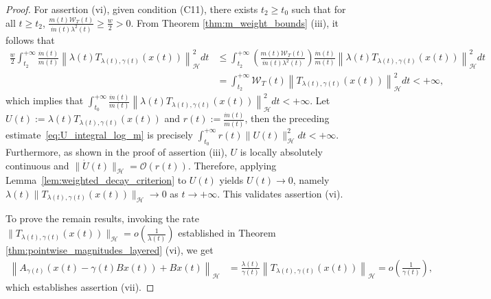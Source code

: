 \documentclass{article}
\theoremstyle{definition}
\theoremstyle{definition}
\theoremstyle{definition}
\begin{document}
\begin{proof}
For assertion (vi), given condition (C11), there exists $t_2 \ge t_0$ such that for all $t \ge t_2$, $\frac{m(t) \mathcal{W}_T(t)}{\dot{m}(t) \lambda^2(t)} \ge \frac{w}{2} > 0$. 
From Theorem \ref{thm:m_weight_bounds} (iii), it follows that
\begin{align}
\frac{w}{2} \int_{t_2}^{+\infty} \frac{\dot{m}(t)}{m(t)} \left\| \lambda(t) T_{\lambda(t), \gamma(t)}(x(t)) \right\|_{\mathcal{H}}^2 dt &\le \int_{t_2}^{+\infty} \left( \frac{m(t) \mathcal{W}_T(t)}{\dot{m}(t) \lambda^2(t)} \right) \frac{\dot{m}(t)}{m(t)} \left\| \lambda(t) T_{\lambda(t), \gamma(t)}(x(t)) \right\|_{\mathcal{H}}^2 dt \nonumber \\
&= \int_{t_2}^{+\infty} \mathcal{W}_T(t) \left\| T_{\lambda(t), \gamma(t)}(x(t)) \right\|_{\mathcal{H}}^2 dt < +\infty, 
\label{eq:U_integral_log_m}
\end{align}
which implies that $\int_{t_0}^{+\infty} \frac{\dot{m}(t)}{m(t)} \left\| \lambda(t) T_{\lambda(t), \gamma(t)}(x(t)) \right\|_{\mathcal{H}}^2 dt < +\infty$. Let $U(t):=\lambda(t)T_{\lambda(t),\gamma(t)}(x(t))$ and $r(t):=\frac{\dot m(t)}{m(t)}$, then the preceding estimate~\eqref{eq:U_integral_log_m} is precisely $\int_{t_0}^{+\infty}r(t)\|U(t)\|_{\mathcal{H}}^2dt<+\infty$. Furthermore, as shown in the proof of assertion {\rm (iii)}, $U$ is locally absolutely continuous and $\|\dot U(t)\|_{\mathcal{H}}=\mathcal{O}(r(t))$. Therefore, applying Lemma~\ref{lem:weighted_decay_criterion} to $U(t)$ yields $U(t)\to0$, namely $\lambda(t)\|T_{\lambda(t),\gamma(t)}(x(t))\|_{\mathcal{H}}\to0$ as $t \to +\infty$. This validates assertion (vi).

To prove the remain results, invoking the rate $\|T_{\lambda(t), \gamma(t)}(x(t))\|_{\mathcal{H}} = o(\frac{1}{\lambda(t)})$ established in Theorem \ref{thm:pointwise_magnitudes_layered} (vi), we get
\begin{align*}
\left\| A_{\gamma(t)} \left( x(t) - \gamma(t) Bx(t) \right) + Bx(t) \right\|_{\mathcal{H}} &= \frac{\lambda(t)}{\gamma(t)} \left\| T_{\lambda(t), \gamma(t)}(x(t)) \right\|_{\mathcal{H}}  = o\left( \frac{1}{\gamma(t)} \right),
\label{eq:operator_sum_magnitude_result}
\end{align*}
which establishes assertion (vii). 


\end{proof}
\end{document}
